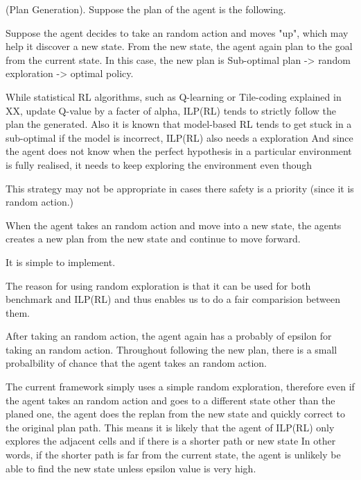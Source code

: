 \begin{examp} \normalfont (Plan Generation).
Suppose the plan of the agent is the following. 

Suppose the agent decides to take an random action and moves "up", which may help it discover a new state. 
From the new state, the agent again plan to the goal from the current state. In this case, the new plan is 
Sub-optimal plan -> random exploration -> optimal policy.

\end{examp}
    

While statistical RL algorithms, such as Q-learning or Tile-coding explained in XX, update Q-value by a facter of alpha, 
ILP(RL) tends to strictly follow the plan the generated. Also it is known that model-based RL tends to get stuck in a sub-optimal if the model is incorrect, ILP(RL) also needs a exploration
And since the agent does not know when the perfect hypothesis in a particular environment is fully realised, it needs to keep exploring the environment even though

This strategy may not be appropriate in cases there safety is a priority (since it is random action.)

When the agent takes an random action and move into a new state, the agents creates a new plan from the new state and continue to move forward.

It is simple to implement.

The reason for using random exploration is that it can be used for both benchmark and ILP(RL) and thus enables us to do a fair comparision between them.

After taking an random action, the agent again has a probably of epsilon for taking an random action. 
Throughout following the new plan, there is a small probalbility of chance that the agent takes an random action.

The current framework simply uses a simple random exploration, therefore even if the agent takes an random action and goes to a different state other than the planed one, 
the agent does the replan from the new state and quickly correct to the original plan path. 
This means it is likely that the agent of ILP(RL) only explores the adjacent cells and if there is a shorter path or new state
In other words, if the shorter path is far from the current state, the agent is unlikely be able to find the new state unless epsilon value is very high. 


